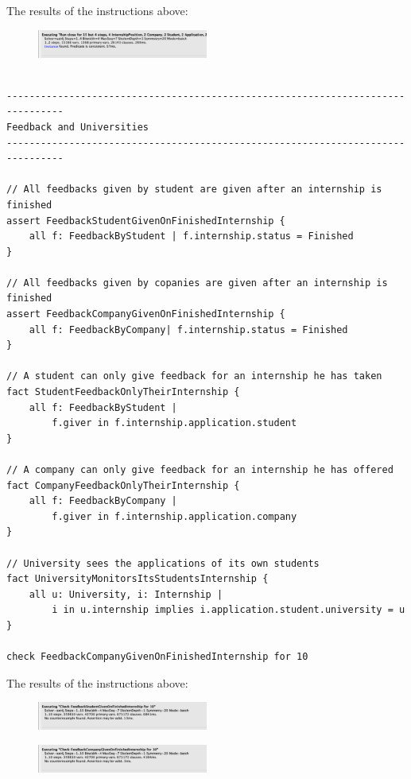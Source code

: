 The results of the instructions above:
\begin{figure}[h!]
    \centering\includegraphics[width=0.5\textwidth]{RASD/Images/Alloy/predfinish.png}
    \label{fig:predfinish}
\end{figure}

\begin{verbatim}

--------------------------------------------------------------------------------
Feedback and Universities
--------------------------------------------------------------------------------

// All feedbacks given by student are given after an internship is finished
assert FeedbackStudentGivenOnFinishedInternship {
    all f: FeedbackByStudent | f.internship.status = Finished
}

// All feedbacks given by copanies are given after an internship is finished
assert FeedbackCompanyGivenOnFinishedInternship {
    all f: FeedbackByCompany| f.internship.status = Finished
}

// A student can only give feedback for an internship he has taken
fact StudentFeedbackOnlyTheirInternship {
    all f: FeedbackByStudent | 
        f.giver in f.internship.application.student
}

// A company can only give feedback for an internship he has offered
fact CompanyFeedbackOnlyTheirInternship {
    all f: FeedbackByCompany | 
        f.giver in f.internship.application.company
}

// University sees the applications of its own students 
fact UniversityMonitorsItsStudentsInternship {
    all u: University, i: Internship | 
        i in u.internship implies i.application.student.university = u
}

check FeedbackCompanyGivenOnFinishedInternship for 10

\end{verbatim}

The results of the instructions above:

\begin{figure}[h!]
    \centering\includegraphics[width=0.5\textwidth]{RASD/Images/Alloy/checkFeedbackStudentGivenOnFinishedInternship.png}
    \label{fig:checkFeedbackStudentGivenOnFinishedInternship}
\end{figure}
\begin{figure}[h!]
    \centering\includegraphics[width=0.5\textwidth]{RASD/Images/Alloy/checkFeedbackCompanyGivenOnFinishedInternship.png}
    \label{fig:checkFeedbackCompanyGivenOnFinishedInternship}
\end{figure}